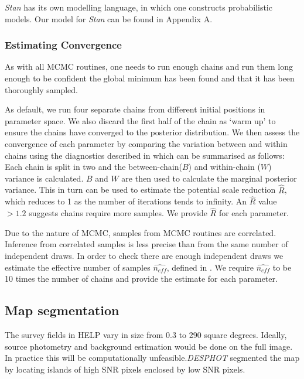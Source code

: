 \documentclass[useAMS,usenatbib]{mnras}
\begin{document}
\textit{Stan} has its own modelling language, in which one constructs probabilistic models. Our model for \textit{Stan} can be found in Appendix A.
\subsubsection{Estimating Convergence}\label{sec:conv}
As with all MCMC routines, one needs to run enough chains and run them long enough to be confident the global minimum has been found and that it has been thoroughly sampled. 

As default, we run four separate chains from different initial positions in parameter space. We also discard the first half of the chain as `warm up' to ensure the chains have converged to the posterior distribution. We then assess the convergence of each parameter by comparing the variation between and within chains using the diagnostics described in \cite{BDA3} which can be summarised as follows: Each chain is split in two and the between-chain($B$) and within-chain ($W$) variance is calculated. $B$ and $W$ are then used to calculate the marginal posterior variance. This in turn can be used to estimate the potential scale reduction $\hat{R}$, which reduces to 1 as the number of iterations tends to infinity. An $\hat{R}$ value $> 1.2$ suggests chains require more samples. We provide $\hat{R}$ for each parameter.

Due to the nature of MCMC, samples from MCMC routines are correlated. Inference from correlated samples is less precise than from the same number of independent draws. In order to check there are enough independent draws we estimate the effective number of samples $\hat{n_{eff}}$, defined in \cite{BDA3}. We require $\hat{n_{eff}}$ to be 10 times the number of chains and provide the estimate for each parameter.

\subsection{Map segmentation}
The survey fields in HELP vary in size from 0.3 to 290 square degrees. Ideally, source photometry and background estimation would be done on the full image. In practice this will be computationally unfeasible.\emph{DESPHOT} segmented the map by locating islands of high SNR pixels enclosed by low SNR pixels.
\end{document}
